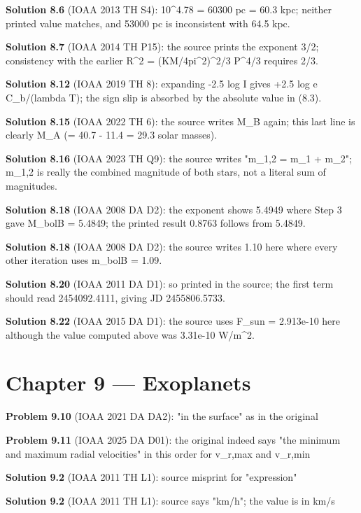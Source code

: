 \noindent\textbf{Solution 8.6} (IOAA 2013 TH S4): 10\^{}{4.78} = 60300 pc = 60.3 kpc; neither printed value matches, and 53000 pc is inconsistent with 64.5 kpc.
\smallskip

\noindent\textbf{Solution 8.7} (IOAA 2014 TH P15): the source prints the exponent 3/2; consistency with the earlier R\^{}2 = (KM/4pi\^{}2)\^{}{2/3} P\^{}{4/3} requires 2/3.
\smallskip

\noindent\textbf{Solution 8.12} (IOAA 2019 TH 8): expanding -2.5 log I gives +2.5 log e C\_b/(lambda T); the sign slip is absorbed by the absolute value in (8.3).
\smallskip

\noindent\textbf{Solution 8.15} (IOAA 2022 TH 6): the source writes M\_B again; this last line is clearly M\_A (= 40.7 - 11.4 = 29.3 solar masses).
\smallskip

\noindent\textbf{Solution 8.16} (IOAA 2023 TH Q9): the source writes "m\_{1,2} = m\_1 + m\_2"; m\_{1,2} is really the combined magnitude of both stars, not a literal sum of magnitudes.
\smallskip

\noindent\textbf{Solution 8.18} (IOAA 2008 DA D2): the exponent shows 5.4949 where Step 3 gave M\_bolB = 5.4849; the printed result 0.8763 follows from 5.4849.
\smallskip

\noindent\textbf{Solution 8.18} (IOAA 2008 DA D2): the source writes 1.10 here where every other iteration uses m\_bolB = 1.09.
\smallskip

\noindent\textbf{Solution 8.20} (IOAA 2011 DA D1): so printed in the source; the first term should read 2454092.4111, giving JD 2455806.5733.
\smallskip

\noindent\textbf{Solution 8.22} (IOAA 2015 DA D1): the source uses F\_sun = 2.913e-10 here although the value computed above was 3.31e-10 W/m\^{}2.
\smallskip

\section*{Chapter 9 --- Exoplanets}

\noindent\textbf{Problem 9.10} (IOAA 2021 DA DA2): "in the surface" as in the original
\smallskip

\noindent\textbf{Problem 9.11} (IOAA 2025 DA D01): the original indeed says "the minimum and maximum radial velocities" in this order for v\_r,max and v\_r,min
\smallskip

\noindent\textbf{Solution 9.2} (IOAA 2011 TH L1): source misprint for "expression"
\smallskip

\noindent\textbf{Solution 9.2} (IOAA 2011 TH L1): source says "km/h"; the value is in km/s
\smallskip

